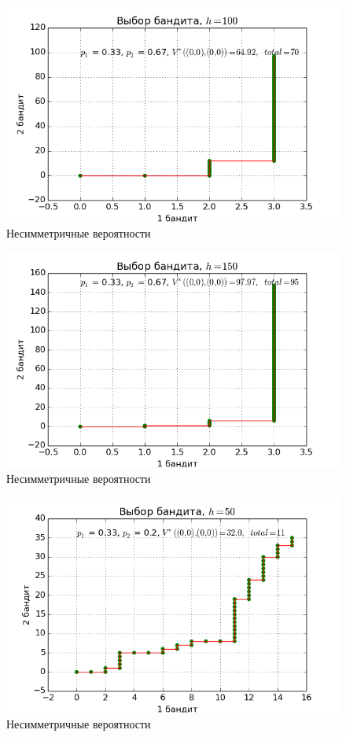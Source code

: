 \documentclass[12pt]{article}
\begin{document}
\begin{figure}
  \begin{center}
  	\caption{Несимметричные вероятности}
    \includegraphics{2bandits-pic2.png}
  \end{center}
\end{figure}
\begin{figure}
  \begin{center}
  	\caption{Несимметричные вероятности}
    \includegraphics{2bandits-pic3.png}
  \end{center}
\end{figure}
\begin{figure}
  \begin{center}
  	\caption{Несимметричные вероятности}
    \includegraphics{2bandits-pic4.png}
  \end{center}
\end{figure}
\end{document}
